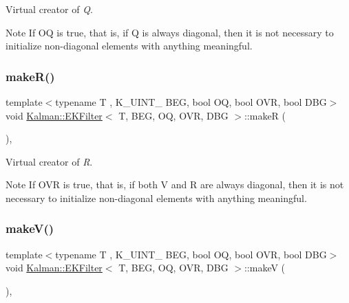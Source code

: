 Virtual creator of {\itshape Q}. 

\begin{DoxyNote}{Note}
If {\ttfamily OQ} is {\ttfamily true}, that is, if {\ttfamily Q} is always diagonal, then it is not necessary to initialize non-\/diagonal elements with anything meaningful. 
\end{DoxyNote}
\mbox{\label{classKalman_1_1EKFilter_aff7a7f2d08673db1330e04e349b3bb8b}} 
\subsubsection{\texorpdfstring{make\+R()}{makeR()}}
{\footnotesize\ttfamily template$<$typename T , K\+\_\+\+U\+I\+N\+T\+\_ B\+EG, bool OQ, bool O\+VR, bool D\+BG$>$ \\
void \mbox{\hyperlink{classKalman_1_1EKFilter}{Kalman\+::\+E\+K\+Filter}}$<$ T, B\+EG, OQ, O\+VR, D\+BG $>$\+::makeR (\begin{DoxyParamCaption}{ }\end{DoxyParamCaption})\hspace{0.3cm}{\ttfamily [protected]}, {\ttfamily [virtual]}}



Virtual creator of {\itshape R}. 

\begin{DoxyNote}{Note}
If {\ttfamily O\+VR} is {\ttfamily true}, that is, if {\ttfamily both} V and R are always diagonal, then it is not necessary to initialize non-\/diagonal elements with anything meaningful. 
\end{DoxyNote}
\mbox{\label{classKalman_1_1EKFilter_a70bb019d226cbf9858954b81c89392a7}} 
\subsubsection{\texorpdfstring{make\+V()}{makeV()}}
{\footnotesize\ttfamily template$<$typename T , K\+\_\+\+U\+I\+N\+T\+\_ B\+EG, bool OQ, bool O\+VR, bool D\+BG$>$ \\
void \mbox{\hyperlink{classKalman_1_1EKFilter}{Kalman\+::\+E\+K\+Filter}}$<$ T, B\+EG, OQ, O\+VR, D\+BG $>$\+::makeV (\begin{DoxyParamCaption}{ }\end{DoxyParamCaption})\hspace{0.3cm}{\ttfamily [protected]}, {\ttfamily [virtual]}}



